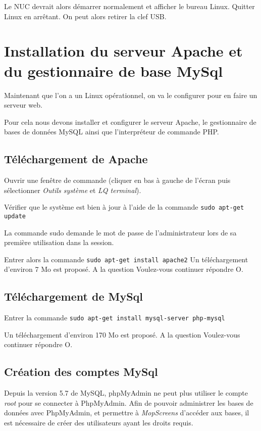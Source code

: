 \documentclass[a4paper]{ffco-rapport}
\begin{document}
Le NUC devrait alors démarrer normalement et afficher le bureau Linux. Quitter Linux en arrêtant. On peut alors retirer la clef USB.


\section{Installation du serveur Apache et du gestionnaire de base MySql}
	Maintenant que l'on a un Linux opérationnel, on va le configurer pour en faire un serveur web.
	
	Pour cela nous devons installer et configurer le serveur Apache, le gestionnaire de bases de données MySQL ainsi que l'interpréteur de commande PHP.

	\subsection{Téléchargement de Apache}
		Ouvrir une fenêtre de commande (cliquer en bas à gauche de l'écran puis sélectionner \emph{Outils système} et \emph{LQ terminal}).
		
		Vérifier que le système est bien à jour à l'aide de la commande \verb|sudo apt-get update|
		
		La commande sudo demande le mot de passe de l'administrateur lors de sa première utilisation dans la session.
		
		Entrer alors la commande \verb|sudo apt-get install apache2| Un téléchargement d'environ 7 Mo est proposé. A la question \og{}Voulez-vous continuer\fg{} répondre O.
		
	\subsection{Téléchargement de MySql}

		Entrer la commande \verb|sudo apt-get install mysql-server php-mysql|
		
		Un téléchargement d'environ 170 Mo est proposé. A la question \og{}Voulez-vous continuer\fg{} répondre O.
		
	\subsection{Création des comptes MySql}
		\label{lbl:utilmysql}
		Depuis la version 5.7 de MySQL, phpMyAdmin ne peut plus utiliser le compte \emph{root} pour se connecter à PhpMyAdmin. 
		Afin de pouvoir administrer les bases de données avec PhpMyAdmin, et permettre à \emph{MopScreens} d'accéder aux bases, il est nécessaire de créer des utilisateurs ayant les droits requis.
		
\end{document}
